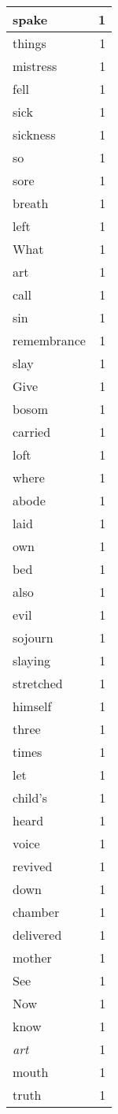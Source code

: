 \begin{center}
\begin{longtable}{l|r}
spake & 1\\ \hline 
things & 1\\ \hline 
mistress & 1\\ \hline 
fell & 1\\ \hline 
sick & 1\\ \hline 
sickness & 1\\ \hline 
so & 1\\ \hline 
sore & 1\\ \hline 
breath & 1\\ \hline 
left & 1\\ \hline 
What & 1\\ \hline 
art & 1\\ \hline 
call & 1\\ \hline 
sin & 1\\ \hline 
remembrance & 1\\ \hline 
slay & 1\\ \hline 
Give & 1\\ \hline 
bosom & 1\\ \hline 
carried & 1\\ \hline 
loft & 1\\ \hline 
where & 1\\ \hline 
abode & 1\\ \hline 
laid & 1\\ \hline 
own & 1\\ \hline 
bed & 1\\ \hline 
also & 1\\ \hline 
evil & 1\\ \hline 
sojourn & 1\\ \hline 
slaying & 1\\ \hline 
stretched & 1\\ \hline 
himself & 1\\ \hline 
three & 1\\ \hline 
times & 1\\ \hline 
let & 1\\ \hline 
child's & 1\\ \hline 
heard & 1\\ \hline 
voice & 1\\ \hline 
revived & 1\\ \hline 
down & 1\\ \hline 
chamber & 1\\ \hline 
delivered & 1\\ \hline 
mother & 1\\ \hline 
See & 1\\ \hline 
Now & 1\\ \hline 
know & 1\\ \hline 
\emph{art} & 1\\ \hline 
mouth & 1\\ \hline 
truth & 1\\ \hline 
\end{longtable}
\end{center}



